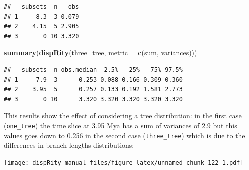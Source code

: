 \documentclass[
]{book}
\newenvironment{Shaded}{\begin{snugshade}}{\end{snugshade}}
\newcommand{\ControlFlowTok}[1]{\textcolor[rgb]{0.13,0.29,0.53}{\textbf{#1}}}
\newcommand{\DataTypeTok}[1]{\textcolor[rgb]{0.13,0.29,0.53}{#1}}
\newcommand{\DecValTok}[1]{\textcolor[rgb]{0.00,0.00,0.81}{#1}}
\newcommand{\FloatTok}[1]{\textcolor[rgb]{0.00,0.00,0.81}{#1}}
\newcommand{\KeywordTok}[1]{\textcolor[rgb]{0.13,0.29,0.53}{\textbf{#1}}}
\newcommand{\NormalTok}[1]{#1}
\newcommand{\OperatorTok}[1]{\textcolor[rgb]{0.81,0.36,0.00}{\textbf{#1}}}
\newcommand{\StringTok}[1]{\textcolor[rgb]{0.31,0.60,0.02}{#1}}
\begin{document}
\begin{verbatim}
##   subsets  n   obs
## 1     8.3  3 0.079
## 2    4.15  5 2.905
## 3       0 10 3.320
\end{verbatim}

\begin{Shaded}
\begin{Highlighting}[]
\KeywordTok{summary}\NormalTok{(}\KeywordTok{dispRity}\NormalTok{(three\_tree, }\DataTypeTok{metric =} \KeywordTok{c}\NormalTok{(sum, variances)))}
\end{Highlighting}
\end{Shaded}

\begin{verbatim}
##   subsets  n obs.median  2.5%   25%   75% 97.5%
## 1     7.9  3      0.253 0.088 0.166 0.309 0.360
## 2    3.95  5      0.257 0.133 0.192 1.581 2.773
## 3       0 10      3.320 3.320 3.320 3.320 3.320
\end{verbatim}

This results show the effect of considering a tree distribution: in the first case (\texttt{one\_tree}) the time slice at 3.95 Mya has a sum of variances of 2.9 but this values goes down to 0.256 in the second case (\texttt{three\_tree}) which is due to the differences in branch lengths distributions:

\begin{Shaded}
\end{Shaded}

\texttt{[image: dispRity\_manual\_files/figure-latex/unnamed-chunk-122-1.pdf]}
\end{document}
